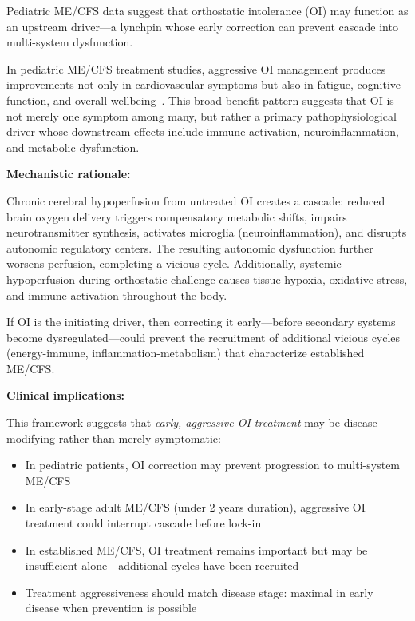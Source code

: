 \begin{keypoint}
\label{keypoint:oi-lynchpin}

Pediatric ME/CFS data suggest that orthostatic intolerance (OI) may function as an upstream driver---a lynchpin whose early correction can prevent cascade into multi-system dysfunction.

In pediatric ME/CFS treatment studies, aggressive OI management produces improvements not only in cardiovascular symptoms but also in fatigue, cognitive function, and overall wellbeing~\cite{Rowe2019pediatric}. This broad benefit pattern suggests that OI is not merely one symptom among many, but rather a primary pathophysiological driver whose downstream effects include immune activation, neuroinflammation, and metabolic dysfunction.

\textbf{Mechanistic rationale:}

Chronic cerebral hypoperfusion from untreated OI creates a cascade: reduced brain oxygen delivery triggers compensatory metabolic shifts, impairs neurotransmitter synthesis, activates microglia (neuroinflammation), and disrupts autonomic regulatory centers. The resulting autonomic dysfunction further worsens perfusion, completing a vicious cycle. Additionally, systemic hypoperfusion during orthostatic challenge causes tissue hypoxia, oxidative stress, and immune activation throughout the body.

If OI is the initiating driver, then correcting it early---before secondary systems become dysregulated---could prevent the recruitment of additional vicious cycles (energy-immune, inflammation-metabolism) that characterize established ME/CFS.

\textbf{Clinical implications:}

This framework suggests that \textit{early, aggressive OI treatment} may be disease-modifying rather than merely symptomatic:

\begin{itemize}
    \item In pediatric patients, OI correction may prevent progression to multi-system ME/CFS
    \item In early-stage adult ME/CFS (under 2 years duration), aggressive OI treatment could interrupt cascade before lock-in
    \item In established ME/CFS, OI treatment remains important but may be insufficient alone---additional cycles have been recruited
    \item Treatment aggressiveness should match disease stage: maximal in early disease when prevention is possible
\end{itemize}


\end{keypoint}

